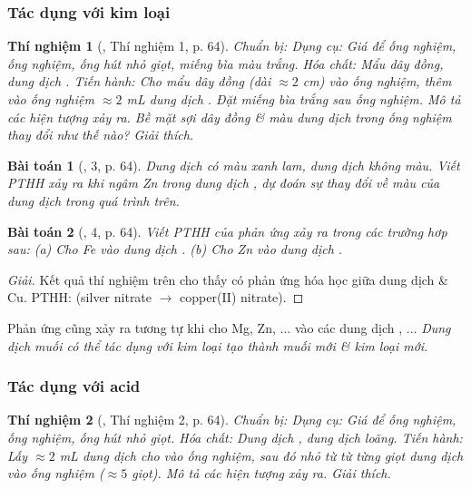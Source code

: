 \documentclass{article}
\newtheorem{baitoan}{Bài toán}
\newtheorem{thinghiem}{Thí nghiệm}
\begin{document}
\subsubsection{Tác dụng với kim loại}

\begin{thinghiem}[\cite{SGK_KHTN_8_Canh_Dieu}, Thí nghiệm 1, p. 64]
	\emph{Chuẩn bị:} Dụng cụ: Giá để ống nghiệm, ống nghiệm, ống hút nhỏ giọt, miếng bìa màu trắng. Hóa chất: Mẩu dây đồng, dung dịch \emph{}. \emph{Tiến hành:} Cho mẩu dây đồng (dài $\approx2$ \emph{cm}) vào ống nghiệm, thêm vào ống nghiệm $\approx2$ \emph{mL} dung dịch \emph{}. Đặt miếng bìa trắng sau ống nghiệm. Mô tả các hiện tượng xảy ra. Bề mặt sợi dây đồng \& màu dung dịch trong ống nghiệm thay đổi như thế nào? Giải thích.
\end{thinghiem}

\begin{baitoan}[\cite{SGK_KHTN_8_Canh_Dieu}, 3, p. 64]
	Dung dịch \emph{} có màu xanh lam, dung dịch \emph{} không màu. Viết PTHH xảy ra khi ngâm \emph{Zn} trong dung dịch \emph{}, dự đoán sự thay đổi về màu của dung dịch trong quá trình trên.
\end{baitoan}

\begin{baitoan}[\cite{SGK_KHTN_8_Canh_Dieu}, 4, p. 64]
	Viết PTHH của phản ứng xảy ra trong các trường hơp sau: (a) Cho \emph{Fe} vào dung dịch \emph{}. (b) Cho \emph{Zn} vào dung dịch \emph{}.
\end{baitoan}

\begin{proof}[Giải]
	Kết quả thí nghiệm trên cho thấy có phản ứng hóa học giữa dung dịch  \& Cu. PTHH:  (silver nitrate $\to$ copper(II) nitrate).
\end{proof}
Phản ứng cũng xảy ra tương tự khi cho Mg, Zn, $\ldots$ vào các dung dịch , $\ldots$ \textit{Dung dịch muối có thể tác dụng với kim loại tạo thành muối mới \& kim loại mới}.

\subsubsection{Tác dụng với acid}

\begin{thinghiem}[\cite{SGK_KHTN_8_Canh_Dieu}, Thí nghiệm 2, p. 64]
	\emph{Chuẩn bị:} Dụng cụ: Giá để ống nghiệm, ống nghiệm, ống hút nhỏ giọt. Hóa chất: Dung dịch \emph{}, dung dịch \emph{} loãng. \emph{Tiến hành:} Lấy $\approx2$ \emph{mL} dung dịch \emph{} cho vào ống nghiệm, sau đó nhỏ từ từ từng giọt dung dịch \emph{} vào ống nghiệm ($\approx5$ giọt). Mô tả các hiện tượng xảy ra. Giải thích.
\end{thinghiem}
\end{document}
